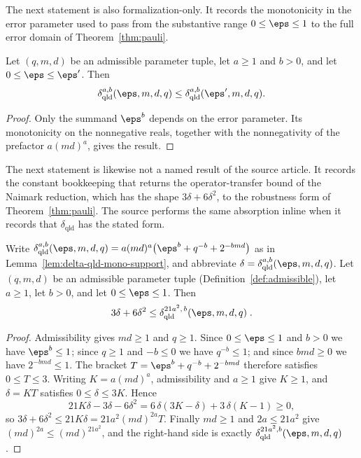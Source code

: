 The next statement is also formalization-only. It records the monotonicity in
the error parameter used to pass from the substantive range $0\leq\eps\leq1$
to the full error domain of Theorem~\ref{thm:pauli}.

\begin{lemma}
  \label{lem:delta-qld-epsilon-mono-support}
  \leanok
  Let $(q,m,d)$ be an admissible parameter tuple, let $a\geq1$ and $b>0$, and
  let $0\leq\eps\leq\eps'$. Then
  \[
    \delta_{\mathrm{qld}}^{a,b}(\eps,m,d,q)
      \leq \delta_{\mathrm{qld}}^{a,b}(\eps',m,d,q).
  \]
\end{lemma}
\begin{proof}
  \leanok
  Only the summand $\eps^b$ depends on the error parameter. Its monotonicity on
  the nonnegative reals, together with the nonnegativity of the prefactor
  $a(md)^a$, gives the result.
\end{proof}

The next statement is likewise not a named result of the source article.  It
records the constant bookkeeping that returns the operator-transfer bound of
the Naimark reduction, which has the shape $3\delta + 6\delta^2$, to the
robustness form of Theorem~\ref{thm:pauli}.  The source performs the same
absorption inline when it records that $\delta_{\mathrm{qld}}$ has the stated
form.

\begin{lemma}\label{lem:delta-qld-scalar-absorption-support}
	\leanok
	Write $\delta_{\mathrm{qld}}^{a,b}(\eps,m,d,q) = a(md)^a\bigl(\eps^b + q^{-b} + 2^{-bmd}\bigr)$ as in Lemma~\ref{lem:delta-qld-mono-support}, and abbreviate $\delta = \delta_{\mathrm{qld}}^{a,b}(\eps,m,d,q)$.  Let $(q,m,d)$ be an admissible parameter tuple (Definition~\ref{def:admissible}), let $a \ge 1$, let $b > 0$, and let $0 \le \eps \le 1$.  Then
	\[
		3\delta + 6\delta^2 \le \delta_{\mathrm{qld}}^{21a^2,\,b}(\eps,m,d,q)\;.
	\]
\end{lemma}
\begin{proof}
	\leanok
	Admissibility gives $md \ge 1$ and $q \ge 1$.  Since $0 \le \eps \le 1$ and $b > 0$ we have $\eps^b \le 1$; since $q \ge 1$ and $-b \le 0$ we have $q^{-b} \le 1$; and since $bmd \ge 0$ we have $2^{-bmd} \le 1$.  The bracket $T = \eps^b + q^{-b} + 2^{-bmd}$ therefore satisfies $0 \le T \le 3$.  Writing $K = a(md)^a$, admissibility and $a \ge 1$ give $K \ge 1$, and $\delta = KT$ satisfies $0 \le \delta \le 3K$.  Hence
	\[
		21K\delta - 3\delta - 6\delta^2 = 6\,\delta(3K - \delta) + 3\,\delta(K - 1) \ge 0,
	\]
	so $3\delta + 6\delta^2 \le 21K\delta = 21a^2 (md)^{2a} T$.  Finally $md \ge 1$ and $2a \le 21a^2$ give $(md)^{2a} \le (md)^{21a^2}$, and the right-hand side is exactly $\delta_{\mathrm{qld}}^{21a^2,b}(\eps,m,d,q)$.
\end{proof}

